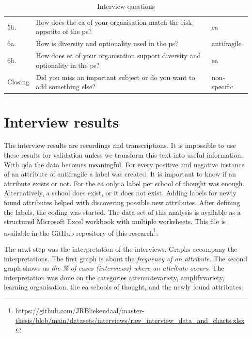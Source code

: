 \begin{table}[H]
{\begin{tabular}{@{}p{}p{}p{}@{}}
			5b. & How does the \acrshort{ea} of your organisation match the risk appetite of the \gls{ps}?
			& \acrshort{ea} \\%
			6a. & How is \gls{diversity} and \gls{optionality} used in the \gls{ps}? & \Gls{antifragile} \\%
			6b. & How does \acrshort{ea} of your organisation support \gls{diversity} and \gls{optionality} in the \gls{ps}? & \acrshort{ea} \\%
			Closing & Did you miss an important subject or do you want to add something else? & non-specific \\%
			\bottomrule
		\end{tabular}
	}%
		\caption[Interview questions]{Interview questions}
		\label{tab:interviewquestions}
\end{table}
\section{Interview results}
\label{sec:interviewresults}
The interview results are recordings and transcriptions. It is impossible to use these results for validation unless we transform this text into useful information. With \acrfull{qda} the data becomes meaningful. For every positive and negative instance of an \gls{attribute} of \gls{antifragile} a label was created. It is important to know if an \gls{attribute} exists or not. For the \acrshort{ea} only a label per school of thought was enough. Alternatively, a school does exist, or it does not exist. Adding labels for newly found attributes helped with discovering possible new attributes. After defining the labels, the coding was started. The data set of this analysis is available as a structured Microsoft Excel workbook with multiple worksheets. This file is available in the GitHub repository of this research\footnote{\url{https://github.com/JRBliekendaal/master-thesis/blob/main/datasets/interviews/raw_interview_data_and_charts.xlsx}}.  

The next step was the interpretation of the interviews. Graphs accompany the interpretations. The first graph is about the \textit{frequency of an \gls{attribute}}. The second graph shows us \textit{the \% of cases (interviews) where an attribute occurs}. The interpretation was done on the categories \gls{attenuatevariety}, \gls{amplifyvariety}, learning organisation, the \acrlong{ea} schools of thought, and the newly found \glspl{attribute}.
